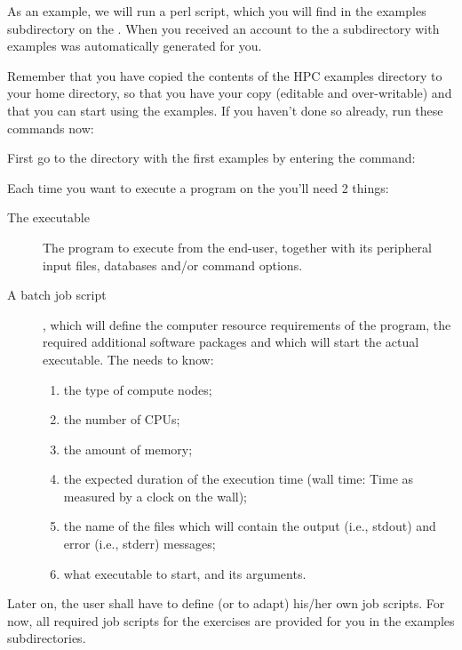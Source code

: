 As an example, we will run a perl script, which you will find in the examples
subdirectory on the \hpc. When you received an account to the \hpc a
subdirectory with examples was automatically generated for you.

Remember that you have copied the contents of the HPC examples directory to
your home directory, so that you have your  copy (editable
and over-writable) and that you can start using the examples. If you haven't
done so already, run these commands now:

\begin{prompt}
\end{prompt}

First go to the directory with the first examples by entering the command:

\begin{prompt}
\end{prompt}

Each time you want to execute a program on the \hpc you'll need 2 things:

\begin{description}
  \item[The executable] The program to execute from the end-user, together with its peripheral input files, databases and/or command options.
  \item[A batch job script], which will define the computer resource requirements of the program, the required additional software packages and which will start the actual executable.  The \hpc needs to know:
    \begin{enumerate}
      \item  the type of compute nodes;
      \item  the number of CPUs;
      \item  the amount of memory;
      \item  the expected duration of the execution time (wall time: Time as measured by a clock on the wall);
      \item  the name of the files which will contain the output (i.e., stdout) and error (i.e., stderr) messages;
      \item  what executable to start, and its arguments.
    \end{enumerate}
\end{description}

Later on, the \hpc user shall have to define (or to adapt) his/her own
job scripts. For now, all required job scripts for the
exercises are provided for you in the examples subdirectories.

